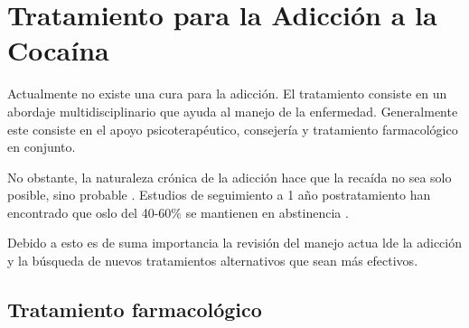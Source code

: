 \section{Tratamiento para la Adicción a la Cocaína}
Actualmente no existe una cura para la adicción.
El tratamiento consiste en un abordaje multidisciplinario que ayuda al manejo de la enfermedad.
Generalmente este consiste en el apoyo psicoterapéutico, consejería y tratamiento farmacológico en conjunto. \par
No obstante, la naturaleza crónica de la adicción hace que la recaída no sea solo posible, sino probable \parencite{NIDA.}.
Estudios de seguimiento a 1 año postratamiento han encontrado que oslo del 40-60\% se mantienen en abstinencia \parencite{McLellan1980}.\par
Debido a esto es de suma importancia la revisión del manejo actua lde la adicción y la búsqueda de nuevos tratamientos alternativos que sean más efectivos.

\subsection{Tratamiento farmacológico}


